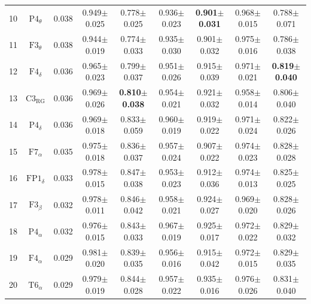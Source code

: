 \documentclass[pdflatex,sn-mathphys]{sn-jnl}%
\theoremstyle{thmstyleone}%
\theoremstyle{thmstyletwo}%
\theoremstyle{thmstylethree}%
\begin{document}
\begin{appendices}
\begin{table}[h!]
{\begin{tabular}{r|cccccccc}
  10 &          $\text{P4}_{\theta}$ &  0.038 &          0.949$\pm$0.025 &          0.778$\pm$0.025 &          0.936$\pm$0.023 & \textbf{0.901$\pm$0.031} &          0.968$\pm$0.015 &          0.788$\pm$0.071 \\
  11 &          $\text{F3}_{\theta}$ &  0.038 &          0.944$\pm$0.019 &          0.774$\pm$0.033 &          0.935$\pm$0.030 &          0.901$\pm$0.032 &          0.975$\pm$0.016 &          0.786$\pm$0.038 \\
  12 &          $\text{F4}_{\delta}$ &  0.036 &          0.965$\pm$0.023 &          0.799$\pm$0.037 &          0.951$\pm$0.026 &          0.915$\pm$0.039 &          0.971$\pm$0.021 & \textbf{0.819$\pm$0.040} \\
  13 &       $\text{C3}_{\text{RG}}$ &  0.036 &          0.969$\pm$0.026 & \textbf{0.810$\pm$0.038} &          0.954$\pm$0.021 &          0.921$\pm$0.032 &          0.958$\pm$0.014 &          0.806$\pm$0.040 \\
  14 &          $\text{P4}_{\delta}$ &  0.036 &          0.969$\pm$0.018 &          0.833$\pm$0.059 &          0.960$\pm$0.019 &          0.919$\pm$0.022 &          0.971$\pm$0.024 &          0.822$\pm$0.026 \\
  15 &          $\text{F7}_{\alpha}$ &  0.035 &          0.975$\pm$0.018 &          0.836$\pm$0.037 &          0.957$\pm$0.024 &          0.907$\pm$0.022 &          0.974$\pm$0.023 &          0.828$\pm$0.028 \\
  16 &         $\text{FP1}_{\delta}$ &  0.033 &          0.978$\pm$0.015 &          0.847$\pm$0.038 &          0.953$\pm$0.023 &          0.912$\pm$0.036 &          0.974$\pm$0.013 &          0.825$\pm$0.025 \\
  17 &           $\text{F3}_{\beta}$ &  0.032 &          0.978$\pm$0.011 &          0.846$\pm$0.042 &          0.958$\pm$0.021 &          0.924$\pm$0.027 &          0.969$\pm$0.020 &          0.828$\pm$0.026 \\
  18 &          $\text{P4}_{\alpha}$ &  0.032 &          0.976$\pm$0.015 &          0.843$\pm$0.033 &          0.967$\pm$0.019 &          0.925$\pm$0.017 &          0.972$\pm$0.022 &          0.829$\pm$0.032 \\
  19 &          $\text{F4}_{\alpha}$ &  0.029 &          0.981$\pm$0.020 &          0.839$\pm$0.035 &          0.956$\pm$0.016 &          0.915$\pm$0.042 &          0.972$\pm$0.015 &          0.829$\pm$0.035 \\
  20 &          $\text{T6}_{\alpha}$ &  0.029 &          0.979$\pm$0.019 &          0.844$\pm$0.028 &          0.957$\pm$0.022 &          0.935$\pm$0.016 &          0.976$\pm$0.026 &          0.831$\pm$0.040 \\

\end{tabular}}
\end{table}
\end{appendices}
\end{document}
